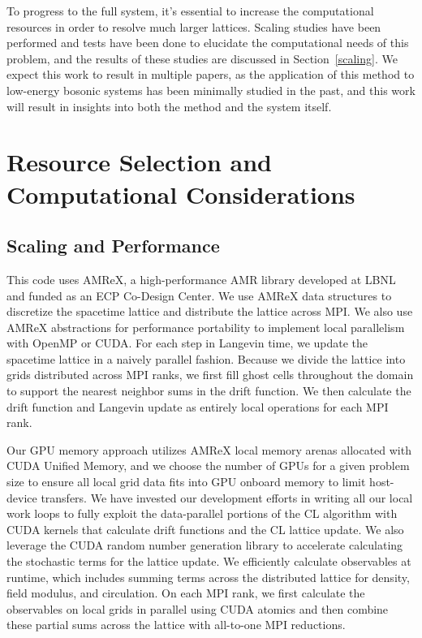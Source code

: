 \documentclass[onecolumn, 12pt]{article}
\begin{document}
To progress to the full system, it's essential to increase the computational resources in order to resolve much larger lattices. Scaling studies have been performed and tests have been done to elucidate the computational needs of this problem, and the results of these studies are discussed in Section~\ref{scaling}. We expect this work to result in multiple papers, as the application of this method to low-energy bosonic systems has been minimally studied in the past, and this work will result in insights into both the method and the system itself.

\section{Resource Selection and Computational Considerations}
\subsection{\label{scaling}Scaling and Performance}
This code uses AMReX, a high-performance AMR library developed at LBNL and funded as an ECP Co-Design Center. We use AMReX data structures to discretize the spacetime lattice and distribute the lattice across MPI. We also use AMReX abstractions for performance portability to implement local parallelism with OpenMP or CUDA.
For each step in Langevin time, we update the spacetime lattice in a naively parallel fashion.
Because we divide the lattice into grids distributed across MPI ranks, we first fill ghost cells throughout the domain to support the nearest neighbor sums in the drift function.
We then calculate the drift function and Langevin update as entirely local operations for each MPI rank.

Our GPU memory approach utilizes AMReX local memory arenas allocated with CUDA Unified Memory, and we choose the number of GPUs for a given problem size to ensure all local grid data fits into GPU onboard memory to limit host-device transfers.
We have invested our development efforts in writing all our local work loops to fully exploit the data-parallel portions of the CL algorithm with CUDA kernels that calculate drift functions and the CL lattice update. We also leverage the CUDA random number generation library to accelerate calculating the stochastic terms for the lattice update.
We efficiently calculate observables at runtime, which includes summing terms across the distributed lattice for density, field modulus, and circulation. On each MPI rank, we first calculate the observables on local grids in parallel using CUDA atomics and then combine these partial sums across the lattice with all-to-one MPI reductions.
\end{document}
